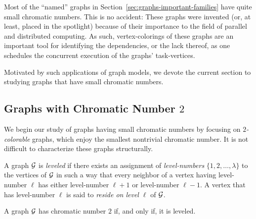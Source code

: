 \bigskip

Most of the ``named'' graphs in Section~\ref{sec:graphs-important-families} have quite small chromatic numbers.  This is no accident: These graphs were invented (or, at least, placed in the spotlight) because of their importance to the field of parallel and distributed computing.  As such, vertex-colorings of these graphs are an important tool for identifying the dependencies, or the lack thereof, as one schedules the concurrent execution of the graphs' task-vertices.

\smallskip

Motivated by such applications of graph models, we devote the current section to studying graphs that have small chromatic numbers.

\subsection{Graphs with Chromatic Number $2$}
\label{sec:2-color-graphs}

We begin our study of graphs having small chromatic numbers by focusing on {\em $2$-colorable} graphs, which enjoy the smallest nontrivial chromatic number.  It is not difficult to characterize these graphs structurally.

\medskip

 
A graph $\mbox{$\cal G$}$ is {\it leveled} if there exists an assignment of {\it level-numbers} $\{ 1, 2, \ldots, \lambda\}$ to the vertices of $\mbox{$\cal G$}$ in such a way that every neighbor of a vertex having level-number $\ell$ has either level-number $\ell +1$ or level-number $\ell -1$.  A vertex that has level-number $\ell$ is said to {\it reside on level $\ell$} of $\mbox{$\cal G$}$.

\begin{prop}
\label{thm:leveled=2-color}
A graph $\mbox{$\cal G$}$ has chromatic number $2$ if, and only if, it is leveled.
\end{prop}

